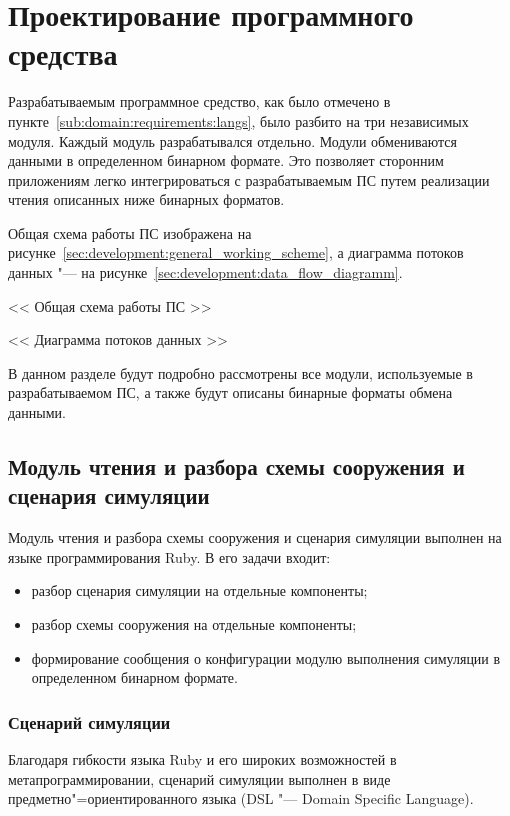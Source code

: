 \section{Проектирование программного средства} %
\label{sec:development}

Разрабатываемым программное средство, как было отмечено в пункте~\ref{sub:domain:requirements:langs}, было разбито на три независимых модуля.
Каждый модуль разрабатывался отдельно. Модули обмениваются данными в определенном бинарном формате.
Это позволяет сторонним приложениям легко интегрироваться с разрабатываемым ПС путем реализации чтения описанных ниже бинарных форматов.

Общая схема работы ПС изображена на рисунке~\ref{sec:development:general_working_scheme}, а диаграмма потоков данных "--- на рисунке~\ref{sec:development:data_flow_diagramm}.

<< Общая схема работы ПС >>

<< Диаграмма потоков данных >>

В данном разделе будут подробно рассмотрены все модули, используемые в разрабатываемом ПС, а также будут описаны бинарные форматы обмена данными.

\subsection{Модуль чтения и разбора схемы сооружения и сценария симуляции}
\label{sec:development:preprocessor}

Модуль чтения и разбора схемы сооружения и сценария симуляции выполнен на языке программирования Ruby.
В его задачи входит:
\begin{itemize}
  \item разбор сценария симуляции на отдельные компоненты;
  \item разбор схемы сооружения на отдельные компоненты;
  \item формирование сообщения о конфигурации модулю выполнения симуляции в определенном бинарном формате.
\end{itemize}

\subsubsection{Сценарий симуляции}
\label{sec:development:preprocessor:scenario_dsl}

Благодаря гибкости языка Ruby и его широких возможностей в метапрограммировании,
сценарий симуляции выполнен в виде предметно"=ориентированного языка (DSL "--- Domain Specific Language).

